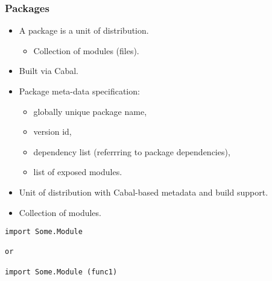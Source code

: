 \begin{frame}[fragile]
  \frametitle{Packages}
  \begin{itemize}
    \item A package is a unit of distribution.
      \begin{itemize}
        \item Collection of modules (files).
      \end{itemize}
    \item Built via Cabal.
    \item Package meta-data specification:
      \begin{itemize}
        \item globally unique package name,
        \item version id,
        \item dependency list (referrring to package dependencies),
        \item list of exposed modules.
      \end{itemize}
    \item Unit of distribution with Cabal-based metadata and build support.
    \item Collection of modules.  
  \end{itemize}
{\small  
\begin{lstlisting}
import Some.Module

or

import Some.Module (func1) 
\end{lstlisting}
}  
\end{frame}